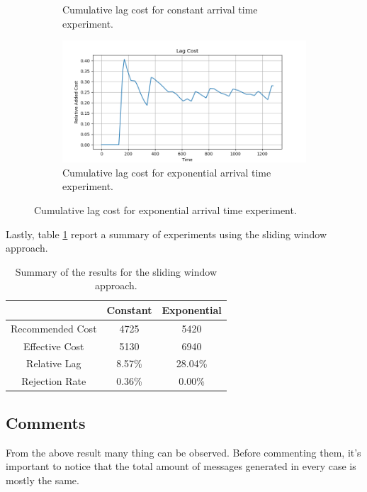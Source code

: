 \begin{figure}[H]
\begin{subfigure}{0.49\linewidth}
	    \caption{Cumulative lag cost for constant arrival time experiment.}
	    \label{fig:sliding_window_constant_lag}
	\end{subfigure}
	\begin{subfigure}{0.49\linewidth}
	    \centering
	    \includegraphics[width=1\linewidth]{images/sliding_window/exponential/lag_cost_cumulative.png}
	    \caption{Cumulative lag cost for exponential arrival time experiment.}
	    \label{fig:sliding_window_exponential_lag}
	\end{subfigure}
\end{figure}

Lastly, table \ref{tab:sliding_window_summary} report a summary of experiments using the sliding window approach.

\begin{table}[h]
	\centering
	\begin{tabular}{|c|c|c|}
		\hline
		& Constant & Exponential \\
		\hline
		Recommended Cost & 4725 & 5420 \\
		\hline
		Effective Cost & 5130 & 6940 \\
		\hline
		Relative Lag & 8.57\% & 28.04\%  \\
		\hline
		Rejection Rate & 0.36\% & 0.00\% \\
		\hline
	\end{tabular}
	\caption{Summary of the results for the sliding window approach.}
	\label{tab:sliding_window_summary}
\end{table}

\subsection{Comments}
From the above result many thing can be observed. Before commenting them, it's important to notice that the total amount of messages generated in every case is mostly the same.

